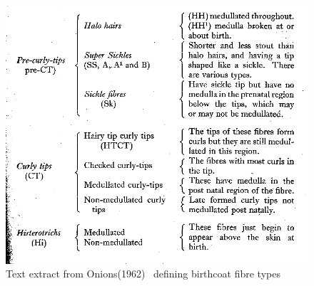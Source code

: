 %

\begin{figure}[!h]
  \centering
   \includegraphics[width=1.0\textwidth]{fibretypes2.png}
  \caption{Text extract from Onions(1962)~\cite{onio:62} defining birthcoat fibre types}
  \label{fig:fibretypes}
\end{figure}

%

